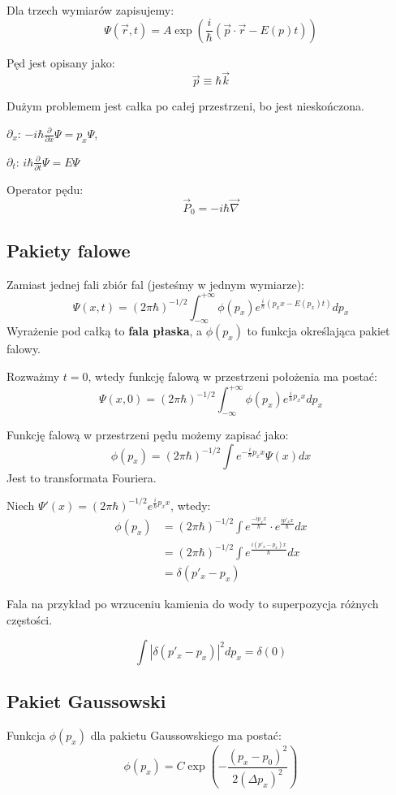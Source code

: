 Dla trzech wymiarów zapisujemy:
\[
\Psi(\vec{r}, t) = A \exp \left( \frac{i}{\hbar} (\vec{p} \cdot \vec{r} - E(p) t) \right)
\]

Pęd jest opisany jako:
\[
\vec{p} \equiv \hbar \vec{k}
\]

Dużym problemem jest całka po całej przestrzeni, bo jest nieskończona.

$\partial_x$: $-i\hbar \frac{\partial}{\partial x} \Psi = p_x \Psi$,

$\partial_t$: $i\hbar \frac{\partial}{\partial t} \Psi = E \Psi$

Operator pędu:
\[
\vec{P}_0 = -i\hbar \vec{\nabla}
\]

\subsection{Pakiety falowe}
Zamiast jednej fali zbiór fal (jesteśmy w jednym wymiarze):
\[
\Psi(x,t) = (2\pi\hbar)^{-1/2} \int_{-\infty}^{+\infty} \phi(p_x) e^{\frac{i}{\hbar} (p_x x - E(p_x) t)} dp_x
\]
Wyrażenie pod całką to \textbf{fala płaska}, a $\phi(p_x)$ to funkcja określająca pakiet falowy.

Rozważmy $t = 0$, wtedy funkcję falową w przestrzeni położenia ma postać:
\[
\Psi(x,0) = (2\pi\hbar)^{-1/2} \int_{-\infty}^{+\infty} \phi(p_x) e^{\frac{i}{\hbar} p_x x} dp_x
\]

Funkcję falową w przestrzeni pędu możemy zapisać jako:
\[
\phi(p_x) = (2\pi\hbar)^{-1/2} \int e^{-\frac{i}{\hbar} p_x x} \Psi(x) dx
\]
Jest to transformata Fouriera.

Niech $\Psi'(x) = (2\pi\hbar)^{-1/2} e^{\frac{i}{\hbar} p_x x}$, wtedy:
\begin{align*}
\phi(p_x) &= (2\pi\hbar)^{-1/2} \int e^\frac{-ip_x x}{\hbar} \cdot e^\frac{ip'_x x}{\hbar} dx \\
&= (2\pi\hbar)^{-1/2} \int e^\frac{i(p'_x - p_x) x}{\hbar} dx \\
&= \delta(p'_x - p_x)
\end{align*}

Fala na przykład po wrzuceniu kamienia do wody to superpozycja różnych częstości.

\[
\int |\delta(p'_x - p_x)|^2 dp_x = \delta(0)
\]

\subsection{Pakiet Gaussowski}
Funkcja $\phi(p_x)$ dla pakietu Gaussowskiego ma postać:
\[
\phi(p_x) = C \exp \left( -\frac{(p_x - p_0)^2}{2 (\Delta p_x)^2} \right)
\]

